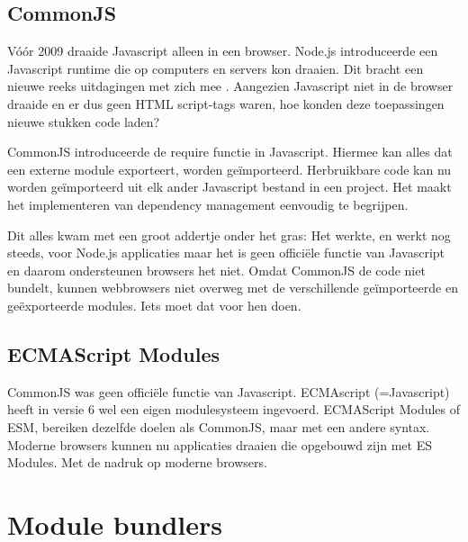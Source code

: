 

\subsection{CommonJS}

Vóór 2009 draaide Javascript alleen in een browser. Node.js introduceerde een Javascript runtime die op computers en servers kon draaien. Dit bracht een nieuwe reeks uitdagingen met zich mee \autocite{crutchfield-2018}. Aangezien Javascript niet in de browser draaide en er dus geen HTML script-tags waren, hoe konden deze toepassingen nieuwe stukken code laden? 

CommonJS introduceerde de require functie in Javascript. Hiermee kan alles dat een externe module exporteert, worden geïmporteerd. Herbruikbare code kan nu worden geïmporteerd uit elk ander Javascript bestand in een project. Het maakt het implementeren van dependency management eenvoudig te begrijpen.

Dit alles kwam met een groot addertje onder het gras: Het werkte, en werkt nog steeds, voor Node.js applicaties maar het is geen officiële functie van Javascript en daarom ondersteunen browsers het niet. Omdat CommonJS de code niet bundelt, kunnen webbrowsers niet overweg met de verschillende geïmporteerde en geëxporteerde modules. Iets moet dat voor hen doen. 





\subsection{ECMAScript Modules}

CommonJS was geen officiële functie van Javascript. ECMAscript (=Javascript) heeft in versie 6 wel een eigen modulesysteem ingevoerd. ECMAScript Modules of ESM, bereiken dezelfde doelen als CommonJS, maar met een andere syntax. Moderne browsers kunnen nu applicaties draaien die opgebouwd zijn met ES Modules. Met de nadruk op moderne browsers. 





\section{Module bundlers}


